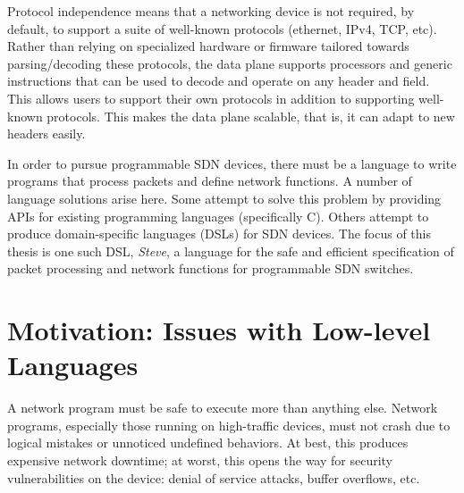 Protocol independence means that a networking device is not required, by default, to support
a suite of well-known protocols (ethernet, IPv4, TCP, etc).
Rather than relying on specialized hardware or firmware tailored towards
parsing/decoding
these protocols, the data plane supports processors
and generic instructions that can be used to decode and operate on
any header and field.
This allows users to support their own protocols in addition to
supporting well-known protocols. This makes the data plane scalable, that is, it
can adapt to new headers easily.

In order to pursue programmable SDN devices, there must be a language to write
programs that process packets and define network functions. 
A number of language solutions arise here.
Some attempt to solve this problem by providing APIs for existing programming
languages (specifically C).
Others attempt to produce domain-specific languages (DSLs) for SDN devices.
The focus of this thesis is one such DSL, \emph{Steve}, a language for the safe
and
efficient specification of packet processing and network functions 
for programmable SDN switches. 


%
%


\section{Motivation: Issues with Low-level Languages}

A network program must be safe to execute more than anything else.
Network programs, especially those running on high-traffic devices, must not
crash due to logical mistakes or unnoticed undefined behaviors.
At best, this produces expensive network downtime; at worst, this
opens the way for security vulnerabilities on the device: 
denial of service attacks, buffer overflows, etc.

